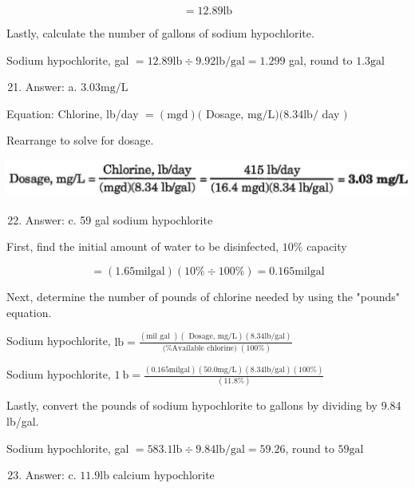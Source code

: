 \documentclass[10pt]{article}
\begin{document}
$$
=12.89 \mathrm{lb}
$$

Lastly, calculate the number of gallons of sodium hypochlorite.

Sodium hypochlorite, gal $=12.89 \mathrm{lb} \div 9.92 \mathrm{lb} / \mathrm{gal}=1.299$ gal, round to $1.3 \mathrm{gal}$

\begin{enumerate}
  \setcounter{enumi}{20}
  \item Answer: a. $3.03 \mathrm{mg} / \mathrm{L}$
\end{enumerate}

Equation: Chlorine, lb/day $=(\mathrm{mgd})($ Dosage, $\mathrm{mg} / \mathrm{L})(8.34 \mathrm{lb} /$ day $)$

Rearrange to solve for dosage.

\includegraphics[max width=\textwidth]{2022_11_10_d6923b5a412978ed01fcg-36}

\begin{enumerate}
  \setcounter{enumi}{21}
  \item Answer: c. 59 gal sodium hypochlorite
\end{enumerate}

First, find the initial amount of water to be disinfected, $10 \%$ capacity

$$
=(1.65 \mathrm{mil} \mathrm{gal})(10 \% \div 100 \%)=0.165 \mathrm{mil} \mathrm{gal}
$$

Next, determine the number of pounds of chlorine needed by using the "pounds" equation.

Sodium hypochlorite, $\mathrm{lb}=\frac{(\mathrm{mil} \text { gal })(\text { Dosage, } \mathrm{mg} / \mathrm{L})(8.34 \mathrm{lb} / \mathrm{gal})}{\text { (\% Available chlorine) }(100 \%)}$

Sodium hypochlorite, $1 \mathrm{~b}=\frac{(0.165 \mathrm{mil} \mathrm{gal})(50.0 \mathrm{mg} / \mathrm{L})(8.34 \mathrm{lb} / \mathrm{gal})(100 \%)}{(11.8 \%)}$

Lastly, convert the pounds of sodium hypochlorite to gallons by dividing by 9.84 lb/gal.

Sodium hypochlorite, gal $=583.1 \mathrm{lb} \div 9.84 \mathrm{lb} / \mathrm{gal}=59.26$, round to $59 \mathrm{gal}$

\begin{enumerate}
  \setcounter{enumi}{22}
  \item Answer: c. $11.9 \mathrm{lb}$ calcium hypochlorite
\end{enumerate}
\end{document}
